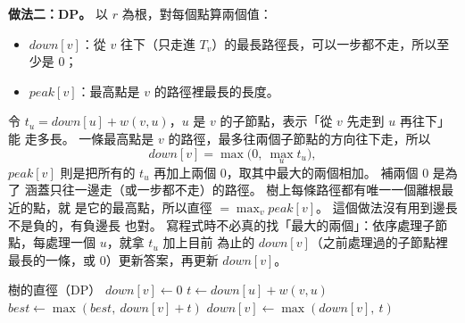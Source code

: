 \begin{center}
\begin{minipage}{\linewidth}
\centering
{}
\label{fig:dp-tree-neg}
\end{minipage}
\end{center}

\textbf{做法二：DP。} 以 $r$ 為根，對每個點算兩個值：
\begin{itemize}
\item $\mathit{down}[v]$：從 $v$ 往下（只走進 $T_v$）的最長路徑長，可以一步都不走，所以至少是 $0$；
\item $\mathit{peak}[v]$：最高點是 $v$ 的路徑裡最長的長度。
\end{itemize}
令 $t_u = \mathit{down}[u] + w(v, u)$，$u$ 是 $v$ 的子節點，表示「從 $v$ 先走到 $u$ 再往下」能
走多長。 一條最高點是 $v$ 的路徑，最多往兩個子節點的方向往下走，所以
\[
\mathit{down}[v] = \max\bigl(0,\ \max_u t_u\bigr),
\]
$\mathit{peak}[v]$ 則是把所有的 $t_u$ 再加上兩個 $0$，取其中最大的兩個相加。 補兩個 $0$ 是為了
涵蓋只往一邊走（或一步都不走）的路徑。 樹上每條路徑都有唯一一個離根最近的點，就
是它的最高點，所以直徑 $= \max_v \mathit{peak}[v]$。 這個做法沒有用到邊長不是負的，有負邊長
也對。 寫程式時不必真的找「最大的兩個」：依序處理子節點，每處理一個 $u$，就拿 $t_u$ 加上目前
為止的 $\mathit{down}[v]$（之前處理過的子節點裡最長的一條，或 $0$）更新答案，再更新
$\mathit{down}[v]$。

\begin{pseudo}[label=alg:dp-tree-diam]{樹的直徑（DP）}
 
    \State $\mathit{down}[v] \gets 0$
            \State {}
            \State $t \gets \mathit{down}[u] + w(v, u)$
            \State $\mathit{best} \gets \max(\mathit{best},\ \mathit{down}[v] + t)$
            \State $\mathit{down}[v] \gets \max(\mathit{down}[v],\ t)$
        \EndIf
    \EndFor
\EndProcedure
\end{pseudo}


